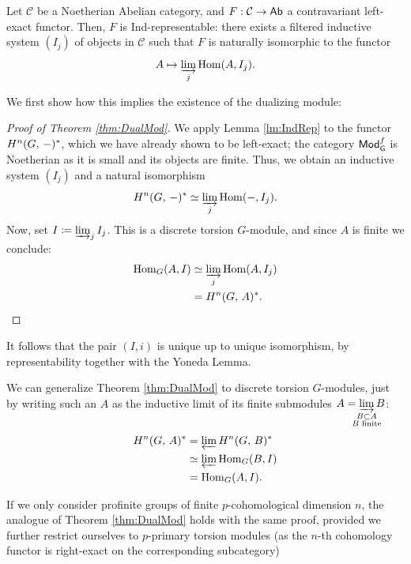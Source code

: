 \documentclass[a4paper, oneside]{memoir}
\begin{document}
\begin{lemma}\label{lm:IndRep}
	Let \(\mathcal{C}\) be a Noetherian Abelian category, and \(F: \mathcal{C}\to\mathsf{Ab}\) a contravariant left-exact functor.
	Then, \(F\) is \textup{Ind}-representable: there exists a filtered inductive system \((I_j)\) of objects in \(\mathcal{C}\) such that \(F\) is naturally isomorphic to the functor
	\[A\mapsto \varinjlim_j \operatorname{Hom}(A, I_j).\]
\end{lemma}

We first show how this implies the existence of the dualizing module:
\begin{proof}[Proof of Theorem \ref{thm:DualMod}]
	We apply Lemma \ref{lm:IndRep} to the functor \(H^{n}( G, \, - )^*\), which we have already shown to be left-exact; the category \(\mathsf{Mod}_{\mathsf{G}}^f\) is Noetherian as it is small and its objects are finite.
	Thus, we obtain an inductive system \((I_j)\) and a natural isomorphism
	\[
		H^{n}( G, \, - )^* \simeq \varinjlim_j \operatorname{Hom}(-,I_j).
	\]
	Now, set \(I\coloneqq \varinjlim_j I_j\). This is a discrete torsion \(G\)-module, and since \(A\) is finite we conclude:
	\begin{align*}
		\operatorname{Hom}_G(A,I) & \simeq \varinjlim_j \operatorname{Hom}(A,I_j) \\
		            & = H^{n}( G, \, A )^*.
	\end{align*}
\end{proof}

\begin{corollary}
	It follows that the pair \((I,i)\) is unique up to unique isomorphism, by representability together with the Yoneda Lemma.
\end{corollary}

\begin{remark}\label{rm:Torsion}
	We can generalize Theorem \ref{thm:DualMod} to discrete torsion \(G\)-modules, just by writing such an \(A\) as the inductive limit of its finite submodules \(A=\displaystyle\varinjlim_{\mathclap{\substack{B\subset A \\B\text{ finite}}}}{B}\):
	\begin{align*}
		H^{n}( G, \, A )^* & =\varprojlim H^{n}( G, \, B )^*     \\
		              & \simeq \varprojlim \operatorname{Hom}_G(B,I) \\
		              & = \operatorname{Hom}_G(A,I).
	\end{align*}
\end{remark}
\begin{remark}\label{rm:pTorsion}
	If we only consider profinite groups of finite \(p\)-cohomological dimension \(n\), the analogue of Theorem \ref{thm:DualMod} holds with the same proof, provided we further restrict ourselves to \(p\)-primary torsion modules (as the \(n\)-th cohomology functor is right-exact on the corresponding subcategory)
\end{remark}
\end{document}
